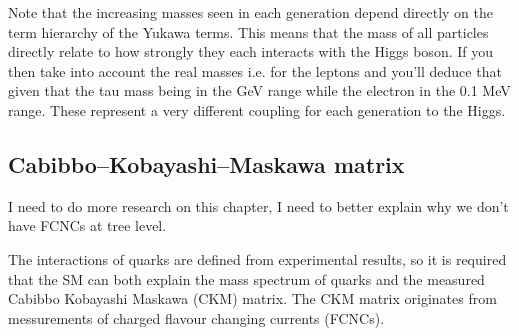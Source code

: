 Note that the increasing masses seen in each generation depend directly on the term hierarchy of the Yukawa terms. This means that the mass of all particles directly relate to how strongly they each interacts with the Higgs boson. If you then take into account the real masses i.e. for the leptons and you'll deduce that given that the tau mass being in the GeV range while the electron in the 0.1 MeV range. These represent a very different coupling for each generation to the Higgs.  

\subsection{Cabibbo–Kobayashi–Maskawa matrix}

{ \color{red} I need to do more research on this chapter, I need to better explain why we don't have FCNCs at tree level. }  

The interactions of quarks are defined from experimental results, so it is required that the SM can both explain the mass spectrum of quarks and the measured Cabibbo Kobayashi Maskawa (CKM) matrix. The CKM matrix originates from messurements of charged flavour changing currents (FCNCs).

